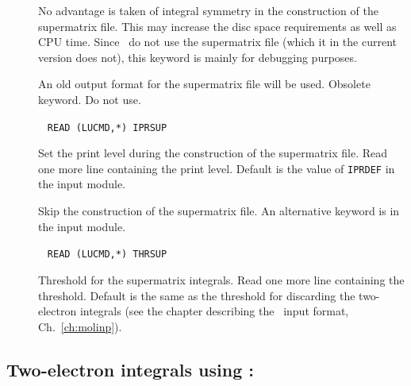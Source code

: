 \begin{description}
\item[] No advantage is taken of integral symmetry in the
construction of the supermatrix file. This may increase the disc space
requirements as well as  CPU time. Since \aba\ do not use the
supermatrix file (which it in the current version does not), this
keyword is mainly for debugging purposes.

\item[] An old output format for the supermatrix file
will be used. Obsolete keyword. Do not use.

\item[]\verb| |\newline
\verb|READ (LUCMD,*) IPRSUP|

Set the print level during the construction of the supermatrix file.
Read one more line containing the print level. Default is the
value of \verb|IPRDEF| in the  input module.

\item[] Skip the construction of the supermatrix file.
An alternative keyword is  in the  input
module.

\item[]\verb| |\newline
\verb|READ (LUCMD,*) THRSUP|

Threshold for the supermatrix integrals. Read one more line containing
the threshold. Default is the same as the threshold for
discarding the two-electron integrals (see the chapter describing the
\mol\ input format, Ch.~\ref{ch:molinp}).
\end{description}

\subsection{Two-electron integrals using {\twoint}: }


